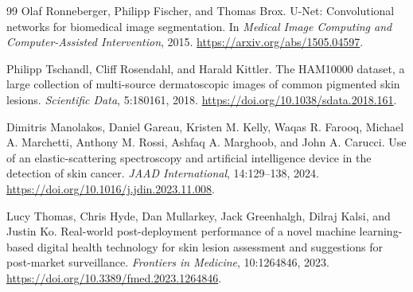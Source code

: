 \documentclass[10pt]{article}
\begin{document}
\begin{thebibliography}{99}
Olaf Ronneberger, Philipp Fischer, and Thomas Brox.
\newblock U-Net: Convolutional networks for biomedical image segmentation.
\newblock In \emph{Medical Image Computing and Computer-Assisted Intervention}, 2015.
\newblock \url{https://arxiv.org/abs/1505.04597}.

Philipp Tschandl, Cliff Rosendahl, and Harald Kittler.
\newblock The HAM10000 dataset, a large collection of multi-source dermatoscopic images of common pigmented skin lesions.
\newblock \emph{Scientific Data}, 5:180161, 2018.
\newblock \url{https://doi.org/10.1038/sdata.2018.161}.

Dimitris Manolakos, Daniel Gareau, Kristen M. Kelly, Waqas R. Farooq, Michael A. Marchetti, Anthony M. Rossi, Ashfaq A. Marghoob, and John A. Carucci.
\newblock Use of an elastic-scattering spectroscopy and artificial intelligence device in the detection of skin cancer.
\newblock \emph{JAAD International}, 14:129--138, 2024.
\newblock \url{https://doi.org/10.1016/j.jdin.2023.11.008}.

Lucy Thomas, Chris Hyde, Dan Mullarkey, Jack Greenhalgh, Dilraj Kalsi, and Justin Ko.
\newblock Real-world post-deployment performance of a novel machine learning-based digital health technology for skin lesion assessment and suggestions for post-market surveillance.
\newblock \emph{Frontiers in Medicine}, 10:1264846, 2023.
\newblock \url{https://doi.org/10.3389/fmed.2023.1264846}.

\end{thebibliography}
\end{document}
